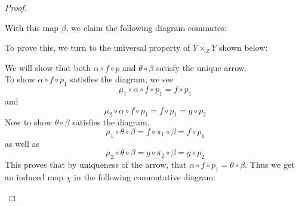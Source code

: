 \documentclass{article}
\begin{document}
\begin{proof}
\begin{center}
\end{center}
With this map $\beta$, we claim the following diagram commutes:
\begin{center}
\end{center}
To prove this, we turn to the universal property of $Y\times_ZY$ shown below:
\begin{center}
\end{center}
We will show that both $\alpha \circ f\circ p$ and $\theta \circ \beta$ satisfy the unique arrow.\\
\newline
To show $\alpha \circ f\circ p_1$ satisfies the diagram, we see
\[
\mu_1\circ \alpha\circ f \circ p_1=f\circ p_1
\]
and
\[
\mu_2\circ \alpha \circ f \circ p_1=f\circ p_1=g\circ p_2
\]
Now to show $\theta\circ \beta$ satisfies the diagram,
\[
\mu_1\circ \theta\circ \beta=f\circ \pi_1\circ \beta=f\circ p_1
\]
as well as
\[
\mu_2\circ \theta\circ \beta=g\circ \pi_2\circ \beta=g\circ p_2
\]
This proves that by uniqueness of the arrow, that $\alpha\circ f\circ p_1=\theta\circ \beta$.
Thus we get an induced map $\chi$ in the following commutative diagram:
\begin{center}
\end{center}
\end{proof}
\end{document}
